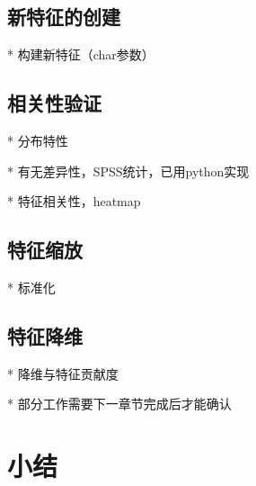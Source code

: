 \subsection{新特征的创建}
* 构建新特征（char参数）
\subsection{相关性验证}
* 分布特性

  * 有无差异性，SPSS统计，已用python实现

  * 特征相关性，heatmap
\subsection{特征缩放}
* 标准化
\subsection{特征降维}
* 降维与特征贡献度

* 部分工作需要下一章节完成后才能确认
\section{小结}